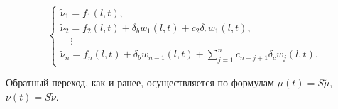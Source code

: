 \begin{equation}

\label{2:nu_JB}

\left\{

  \begin{array}{l}

    \tilde{\nu}_1={f_1(l,t)}, \\

    \tilde{\nu}_2={f_2(l,t)}+\delta_b w_1(l,t)+c_2\delta_c {w_1(l,t)}, \\

~~~~\,\vdots \\

    \tilde{\nu}_n={f_n(l,t)}+\delta_b w_{n-1}(l,t)+\sum_{j=1}^{n}{c_{n-j+1}\delta_c{w_{j}(l,t)}}.

  \end{array}

\right.

\end{equation}




%










Обратный переход, как и ранее, осуществляется по формулам $\mu(t)=S\tilde{\mu}$, $\nu(t)=S\tilde{\nu}$.



